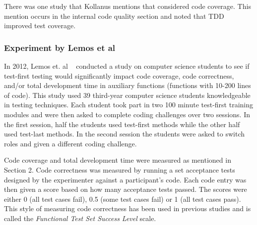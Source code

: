 \documentclass{sig-alternate}
\begin{document}
There was one study that Kollanus mentions that considered code coverage.  This mention occurs in the internal code quality section and noted that TDD improved test coverage.



\subsubsection{Experiment by Lemos et al} 

In 2012, Lemos et. al ~\cite{Lemos:2012} conducted a study on computer science students to see if test-first testing would significantly impact code coverage,  code correctness, and/or total development time in auxiliary functions (functions with 10-200 lines of code).   This study used 39 third-year computer science students knowledgeable in testing techniques. Each student took part in  two 100 minute test-first training modules and were then asked to complete coding challenges over two sessions.  In the first session, half the students used test-first methods while the other half used test-last methods.  In the second session the students were asked to switch roles and given a different coding challenge.

Code coverage and total development time were measured as mentioned in Section 2.  Code correctness was measured by running a set acceptance tests designed by the experimenter against a participant's code. Each code entry was then given a score based on how many acceptance tests passed.  The scores were either 0 (all test cases fail), 0.5 (some test cases fail) or 1 (all test cases pass).  This style of measuring code correctness has been used in previous studies and is called the \textit{Functional Test Set Success Level} scale.
\end{document}
